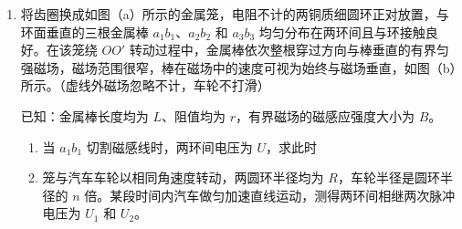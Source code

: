 \documentclass[\gkver]{gaokaozhenti}
\begin{document}
\begin{enumerate}
\begin{enumerate}
\begin{enumerate}
		\onepicture[align=right, w=2.72cm]{}

		\item
		传感器测得的正弦交流电电压最大值为 $U_{m}$，经半波整流后的波形如图（b）所示，整流后电压的有效值为 。

		\onepicture[align=right, w=2.93cm]{}
	\end{enumerate}

	\item
	将齿圈换成如图（a）所示的金属笼，电阻不计的两铜质细圆环正对放置，与环面垂直的三根金属棒 $a_{1}b_{1}$、$a_{2}b_{2}$ 和 $a_{3}b_{3}$ 均匀分布在两环间且与环接触良好。在该笼绕 $OO'$ 转动过程中，金属棒依次整根穿过方向与棒垂直的有界匀强磁场，磁场范围很窄，棒在磁场中的速度可视为始终与磁场垂直，如图（b）所示。（虚线外磁场忽略不计，车轮不打滑）

	\onepicture[align=right, w=9.00cm]{}

	已知：金属棒长度均为 $L$、阻值均为 $r$，有界磁场的磁感应强度大小为 $B$。

	\begin{enumerate}
		\item
		当 $a_{1}b_{1}$ 切割磁感线时，两环间电压为 $U$，求此时


		\item
		笼与汽车车轮以相同角速度转动，两圆环半径均为 $R$，车轮半径是圆环半径的 $n$ 倍。某段时间内汽车做匀加速直线运动，测得两环间相继两次脉冲电压为 $U_{1}$ 和 $U_{2}$。

	\end{enumerate}
\end{enumerate}
\end{enumerate}
\end{document}
